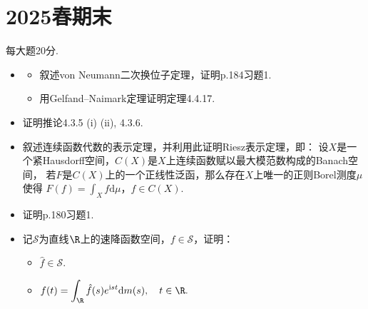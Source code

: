 \section{2025春期末}
每大题20分.
\begin{itemize}
\item[一、]
\begin{itemize}
    \item[(1)]叙述von Neumann二次换位子定理，证明p.184习题1.
    \item[(2)]用Gelfand--Naimark定理证明定理4.4.17.
\end{itemize}

\item[二、]证明推论4.3.5 (i) (ii), 4.3.6.

\item[三、]叙述连续函数代数的表示定理，并利用此证明Riesz表示定理，即：
设$X$是一个紧Hausdorff空间，$C(X)$是$X$上连续函数赋以最大模范数构成的Banach空间，
若$F$是$C(X)$上的一个正线性泛函，那么存在$X$上唯一的正则Borel测度$\mu$使得
$F(f)=\displaystyle\int_X f\text{d}\mu$，$f\in C(X)$.

\item[四、]证明p.180习题1.

\item[五、]记$\mathcal{S}$为直线$\R$上的速降函数空间，$f\in\mathcal{S}$，证明：
\begin{itemize}
    \item[(1)]$\hat{f}\in\mathcal{S}$.
    \item[(2)]$f(t)=\displaystyle\int_{\R}\hat{f}(s)e^{\text{i}st}\text{d}m(s),\quad t\in\R.$
\end{itemize}
\end{itemize}

